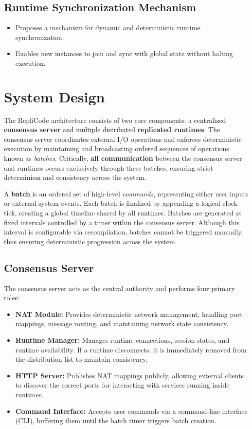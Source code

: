 \documentclass[10pt, 
]{IEEEtran}
\begin{document}
\subsection{Runtime Synchronization Mechanism}
\begin{itemize}
    \item Proposes a mechanism for dynamic and deterministic runtime synchronization.
    \item Enables new instances to join and sync with global state without halting execution.
\end{itemize}

\section{System Design}

The RepliCode architecture consists of two core components: a centralized \textbf{consensus server} and multiple distributed \textbf{replicated runtimes}. The consensus server coordinates external I/O operations and enforces deterministic execution by maintaining and broadcasting ordered sequences of operations known as \emph{batches}. Critically, \textbf{all communication} between the consensus server and runtimes occurs exclusively through these batches, ensuring strict determinism and consistency across the system.

A \textbf{batch} is an ordered set of high-level \emph{commands}, representing either user inputs or external system events. Each batch is finalized by appending a logical clock tick, creating a global timeline shared by all runtimes. Batches are generated at fixed intervals controlled by a timer within the consensus server. Although this interval is configurable via recompilation, batches cannot be triggered manually, thus ensuring deterministic progression across the system.

\subsection{Consensus Server}

The consensus server acts as the central authority and performs four primary roles:

\begin{itemize}
\item \textbf{NAT Module:} Provides deterministic network management, handling port mappings, message routing, and maintaining network state consistency.
\item \textbf{Runtime Manager:} Manages runtime connections, session states, and runtime availability. If a runtime disconnects, it is immediately removed from the distribution list to maintain consistency.
\item \textbf{HTTP Server:} Publishes NAT mappings publicly, allowing external clients to discover the correct ports for interacting with services running inside runtimes.
\item \textbf{Command Interface:} Accepts user commands via a command-line interface (CLI), buffering them until the batch timer triggers batch creation.
\end{itemize}
\end{document}
